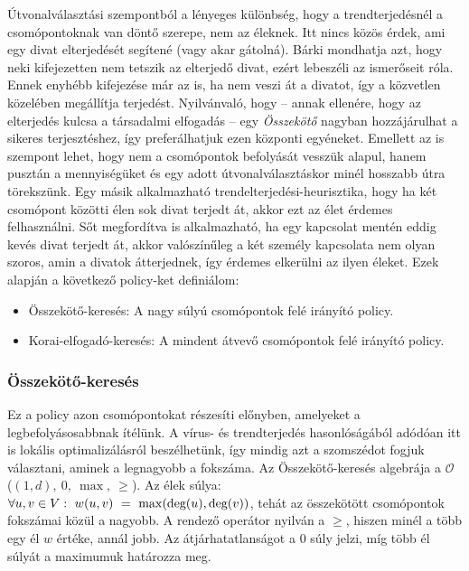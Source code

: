     Útvonalválasztási szempontból a lényeges különbség, hogy a trendterjedésnél a csomópontoknak van döntő szerepe, nem az éleknek. Itt nincs közös érdek, ami egy divat elterjedését segítené (vagy akar gátolná). Bárki mondhatja azt, hogy neki kifejezetten nem tetszik az elterjedő divat, ezért lebeszéli az ismerőseit róla. Ennek enyhébb kifejezése már az is, ha nem veszi át a divatot, így a közvetlen közelében megállítja terjedést. Nyilvánvaló, hogy -- annak ellenére, hogy az elterjedés kulcsa a társadalmi elfogadás -- egy \textit{Összekötő} nagyban hozzájárulhat a sikeres terjesztéshez, így preferálhatjuk ezen központi egyéneket. Emellett az is szempont lehet, hogy nem a csomópontok befolyását vesszük alapul, hanem pusztán a mennyiségüket és egy adott útvonalválasztáskor minél hosszabb útra törekszünk. Egy másik alkalmazható trendelterjedési-heurisztika, hogy ha két csomópont közötti élen sok divat terjedt át, akkor ezt az élet érdemes felhasználni. Sőt megfordítva is alkalmazható, ha egy kapcsolat mentén eddig kevés divat terjedt át, akkor valószínűleg a két személy kapcsolata nem olyan szoros, amin a divatok átterjednek, így érdemes elkerülni az ilyen éleket. Ezek alapján a következő policy-ket definiálom:

    \begin{itemize}
      \item Összekötő-keresés: A nagy súlyú csomópontok felé irányító policy.
      \item Korai-elfogadó-keresés: A mindent átvevő csomópontok felé irányító policy.
    \end{itemize}

      \subsubsection{Összekötő-keresés}\label{osszekoto_kereses}
      Ez a policy azon csomópontokat részesíti előnyben, amelyeket a legbefolyásosabbnak ítélünk. A vírus- és trendterjedés hasonlóságából adódóan itt is lokális optimalizálásról beszélhetünk, így mindig azt a szomszédot fogjuk választani, aminek a legnagyobb a fokszáma. Az Összekötő-keresés algebrája a $\mathcal{O}$ ($(1,d),~0,~\max,~\geq$). Az élek súlya:
      $\forall u,v \in V:~w(u,v)~=~\max(\hbox{deg}(u),\hbox{deg}(v))$, tehát az összekötött csomópontok fokszámai közül a nagyobb. A rendező operátor nyilván a $\geq$, hiszen minél a több egy él $w$ értéke, annál jobb. Az átjárhatatlanságot a 0 súly jelzi, míg több él súlyát a maximumuk határozza meg.

